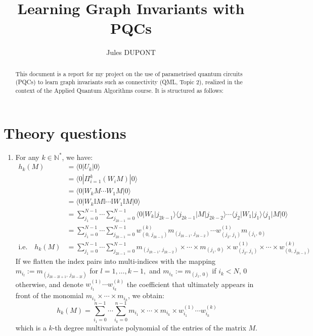 \documentclass{article}
\title{Learning Graph Invariants with PQCs}
\author{Jules DUPONT}
\theoremstyle{definition}
\theoremstyle{plain}
\begin{document}
\maketitle

\begin{abstract}
This document is a report for my project on the use of parametrised quantum circuits (PQCs) to learn graph invariants such as connectivity (QML, Topic 2), realized in the context of the Applied Quantum Algorithms course. It is structured as follows:
\end{abstract}

\section{Theory questions}

\begin{enumerate}
    \item For any $k\in \mathbb{N}^*$, we have:
    \begin{align*}
        h_k(M) &= \langle 0 | U_k | 0 \rangle \\
        &= \langle 0 | \Pi_{i=1}^k (W_i M) | 0 \rangle \\
        &= \langle 0 | W_kM \cdots W_1M | 0 \rangle \\
        &= \langle 0 | W_k\mathbb{I}M\mathbb{I} \cdots \mathbb{I}W_1\mathbb{I}M | 0 \rangle \\
        &= \sum_{j_1=0}^{N-1} \cdots \sum_{j_{2k-1}=0}^{N-1} \langle 0 | W_k | j_{2k-1} \rangle \langle j_{2k-1} | M | j_{2k-2} \rangle \cdots \langle j_2  | W_1 | j_1 \rangle \langle j_1 | M | 0 \rangle \\
        &= \sum_{j_1=0}^{N-1} \cdots \sum_{j_{2k-1}=0}^{N-1} w^{(k)}_{(0, \, j_{2k-1})} m_{(j_{2k-1}, \, j_{2k-2})}\cdots w^{(1)}_{(j_2, \, j_1)} m_{(j_1, \, 0)} \\
        \text{i.e.} \quad h_k(M) &= \sum_{j_1=0}^{N-1} \cdots \sum_{j_{2k-1}=0}^{N-1} m_{(j_{2k-1}, \, j_{2k-2})} \times \cdots \times m_{(j_1, \, 0)} \times w^{(1)}_{(j_2, \, j_1)} \times \cdots \times w^{(k)}_{(0, \, j_{2k-1})}
    \end{align*}
    If we flatten the index pairs into multi-indices with the mapping $m_{i_l} := m_{(j_{2k-2l+1}, \, j_{2k-2l})}$ for $ l = 1, \dots, k-1, $ and $ m_{i_k} := m_{(j_1, \, 0)}$ if $i_k < N$, $0$ otherwise, and denote $w^{(1)}_{i_1} \cdots w^{(k)}_{i_k}$ the coefficient that ultimately appears in front of the monomial $m_{i_1} \times \cdots \times m_{i_k}$, we obtain:
    \[ h_k(M) = \sum_{i_1=0}^{n-1} \cdots \sum_{i_{k}=0}^{n-1} m_{i_1} \times \cdots \times m_{i_k} \times w^{(1)}_{i_1} \cdots w^{(k)}_{i_k} \]
    which is a $k$-th degree multivariate polynomial of the entries of the matrix $M$.
    


\end{enumerate}
\end{document}
